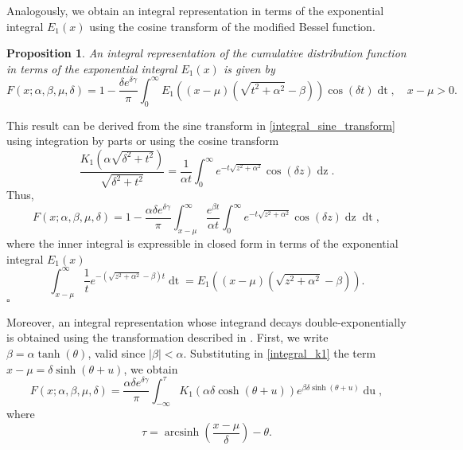 \documentclass[10pt,a4paper,oneside]{article}
\newtheorem{proposition}[theorem]{Proposition}
\newenvironment{proof}{\noindent{\bf Proof:}}{\hfill$\square$}
\DeclareMathOperator{\arcsinh}{arcsinh}
\numberwithin{equation}{section}
\begin{document}
Analogously, we obtain an integral representation in terms of the exponential integral $E_1(x)$ using the cosine transform of the modified Bessel function.
\begin{proposition}
An integral representation of the cumulative distribution function in terms of the exponential integral $E_1(x)$ is given by
\begin{equation}
F(x; \alpha, \beta, \mu, \delta) = 1 - \frac{\delta e^{\delta \gamma}}{\pi}\int_0^{\infty} E_1\left((x-\mu)(\sqrt{t^2 + \alpha^2} - \beta)\right) \cos(\delta t) \mathop{dt}, \quad x-\mu > 0.
\end{equation}
\end{proposition}
\begin{proof}
This result can be derived from the sine transform in \eqref{integral_sine_transform} using integration by parts or using the cosine transform \cite[\S 1.4]{Bateman1954}
\begin{equation*}
\frac{K_1\left(\alpha\sqrt{\delta^2 + t^2}\right)}{\sqrt{\delta^2 + t^2}} = \frac{1}{\alpha t}\int_0^{\infty} e^{-t\sqrt{z^2 + \alpha^2}} \cos(\delta z) \mathop{dz}.
\end{equation*}
Thus,
\begin{equation*}
F(x; \alpha, \beta, \mu, \delta) = 1 - \frac{\alpha \delta e^{\delta \gamma}}{\pi}\int_{x-\mu}^{\infty} \frac{e^{\beta t}}{\alpha t}\int_0^{\infty} e^{-t\sqrt{z^2 + \alpha^2}} \cos(\delta z) \mathop{dz} \mathop{dt},
\end{equation*}
where the inner integral is expressible in closed form in terms of the exponential integral $E_1(x)$
\begin{equation*}
\int_{x-\mu}^{\infty}\frac{1}{t}e^{-(\sqrt{z^2 + \alpha^2} - \beta)t} \mathop{dt} = E_1\left((x-\mu)(\sqrt{z^2 + \alpha^2} - \beta)\right).
\end{equation*}
\end{proof}

Moreover, an integral representation whose integrand decays double-exponentially is obtained using the transformation described in \cite[\S 42.4]{Temme2015}. First, we write $\beta = \alpha \tanh(\theta)$, valid since $|\beta| < \alpha$. Substituting in \eqref{integral_k1} the term $x-\mu = \delta \sinh(\theta + u)$, we obtain
\begin{equation}
F(x; \alpha, \beta, \mu, \delta) = \frac{\alpha \delta e^{\delta \gamma}}{\pi} \int_{-\infty}^{\tau} K_1 \left(\alpha \delta \cosh(\theta + u)\right) e^{\beta \delta \sinh(\theta + u)} \mathop{du},
\end{equation}
where
\begin{equation}
\tau = \arcsinh\left(\frac{x - \mu}{\delta}\right) - \theta.
\end{equation}
\end{document}

